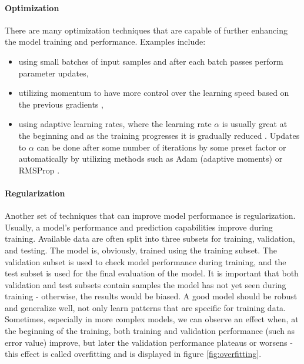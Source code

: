 \paragraph{Optimization}
There are many optimization techniques that are capable of further enhancing the model training and performance. Examples include:

\begin{itemize}
    \item using small batches of input samples and after each batch passes perform parameter updates,
    \item utilizing momentum \cite{Polyak1964} to have more control over the learning speed based on the previous gradients \cite{Santosh2022-2},
    \item using adaptive learning rates, where the learning rate $\alpha$ is usually great at the beginning and as the training progresses it is gradually reduced \cite{Santosh2022-2}. Updates to $\alpha$ can be done after some number of iterations by some preset factor or automatically by utilizing methods such as Adam (adaptive moments) \cite{Kingma2014} or RMSProp \cite{Zou2019}.
\end{itemize}

\paragraph{Regularization}
Another set of techniques that can improve model performance is regularization. Usually, a model's performance and prediction capabilities improve during training. Available data are often split into three subsets for training, validation, and testing. The model is, obviously, trained using the training subset. The validation subset is used to check model performance during training, and the test subset is used for the final evaluation of the model. It is important that both validation and test subsets contain samples the model has not yet seen during training - otherwise, the results would be biased. A good model should be robust and generalize well, not only learn patterns that are specific for training data. Sometimes, especially in more complex models, we can observe an effect when, at the beginning of the training, both training and validation performance (such as error value) improve, but later the validation performance plateaus or worsens - this effect is called overfitting \cite{Schaffer1993} and is displayed in figure \ref{fig:overfitting}. 

